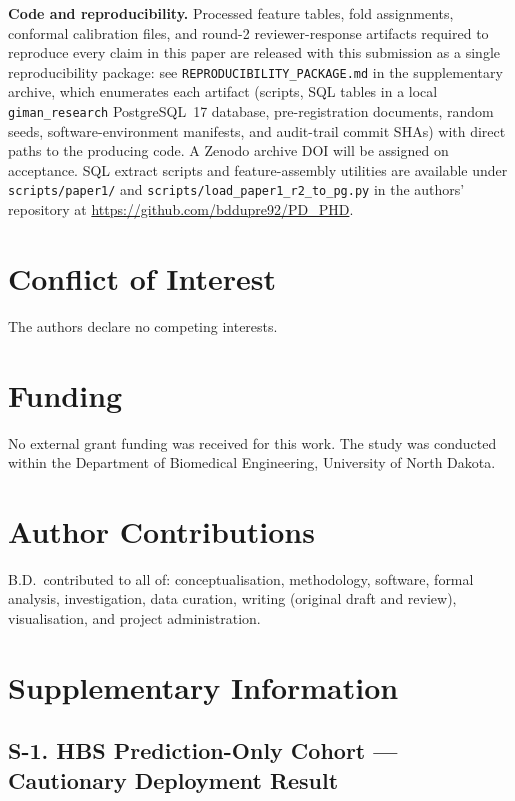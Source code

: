 \textbf{Code and reproducibility.} Processed feature tables, fold assignments, conformal calibration files, and round-2 reviewer-response artifacts required to reproduce every claim in this paper are released with this submission as a single reproducibility package: see \texttt{REPRODUCIBILITY\_PACKAGE.md} in the supplementary archive, which enumerates each artifact (scripts, SQL tables in a local \texttt{giman\_research} PostgreSQL~17 database, pre-registration documents, random seeds, software-environment manifests, and audit-trail commit SHAs) with direct paths to the producing code. A Zenodo archive DOI will be assigned on acceptance. SQL extract scripts and feature-assembly utilities are available under \texttt{scripts/paper1/} and \texttt{scripts/load\_paper1\_r2\_to\_pg.py} in the authors' repository at \url{https://github.com/bddupre92/PD_PHD}.

\section*{Conflict of Interest}
The authors declare no competing interests.

\section*{Funding}
No external grant funding was received for this work. The study was conducted within the Department of Biomedical Engineering, University of North Dakota.

\section*{Author Contributions}
B.D.\ contributed to all of: conceptualisation, methodology, software, formal analysis, investigation, data curation, writing (original draft and review), visualisation, and project administration.

\section*{Supplementary Information}
\label{p1:sec:supp}

\subsection*{S-1. HBS Prediction-Only Cohort --- Cautionary Deployment Result}
\label{p1:sec:supp:hbs}

